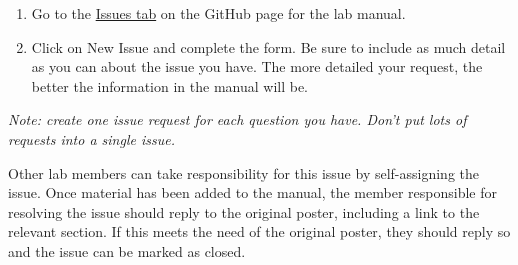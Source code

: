 \documentclass[]{book}
\providecommand{\tightlist}{%
  \setlength{\itemsep}{0pt}\setlength{\parskip}{0pt}}
\begin{document}
\begin{enumerate}
\def\labelenumi{\arabic{enumi}.}
\tightlist
\item
  Go to the \href{https://github.com/pie-lab/manual/issues}{Issues tab} on the GitHub page for the lab manual.
\item
  Click on New Issue and complete the form. Be sure to include as much detail as you can about the issue you have. The more detailed your request, the better the information in the manual will be.
\end{enumerate}

\emph{Note: create one issue request for each question you have. Don't put lots of requests into a single issue.}

Other lab members can take responsibility for this issue by self-assigning the issue. Once material has been added to the manual, the member responsible for resolving the issue should reply to the original poster, including a link to the relevant section. If this meets the need of the original poster, they should reply so and the issue can be marked as closed.


\end{document}
